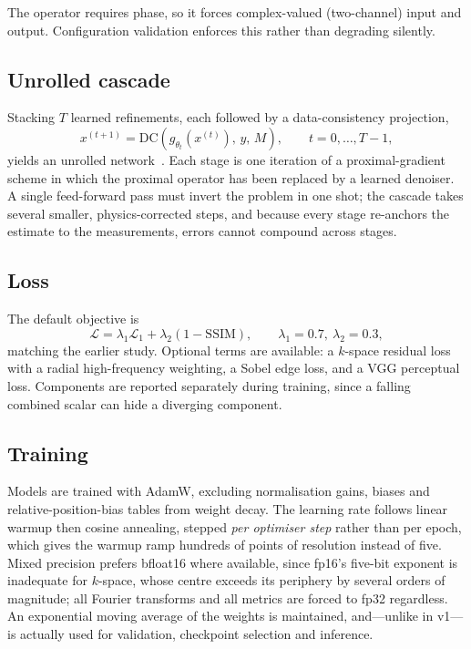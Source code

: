 \documentclass[11pt]{article}
\begin{document}
The operator requires phase, so it forces complex-valued (two-channel) input and
output. Configuration validation enforces this rather than degrading silently.

\subsection{Unrolled cascade}

Stacking $T$ learned refinements, each followed by a data-consistency
projection,
\begin{equation}
x^{(t+1)} = \mathrm{DC}\!\left(g_{\theta_t}(x^{(t)}),\, y,\, M\right),
\qquad t = 0,\dots,T-1,
\end{equation}
yields an unrolled network~\cite{schlemper2018, hammernik2018}. Each stage is
one iteration of a proximal-gradient scheme in which the proximal operator has
been replaced by a learned denoiser. A single feed-forward pass must invert the
problem in one shot; the cascade takes several smaller, physics-corrected steps,
and because every stage re-anchors the estimate to the measurements, errors
cannot compound across stages.

\subsection{Loss}

The default objective is
\begin{equation}
\mathcal{L} = \lambda_1 \mathcal{L}_{1} + \lambda_2 (1 - \mathrm{SSIM}),
\qquad \lambda_1 = 0.7,\ \lambda_2 = 0.3,
\end{equation}
matching the earlier study. Optional terms are available: a $k$-space residual
loss with a radial high-frequency weighting, a Sobel edge loss, and a VGG
perceptual loss. Components are reported separately during training, since a
falling combined scalar can hide a diverging component.

\subsection{Training}

Models are trained with AdamW, excluding normalisation gains, biases and
relative-position-bias tables from weight decay. The learning rate follows
linear warmup then cosine annealing, stepped \emph{per optimiser step} rather
than per epoch, which gives the warmup ramp hundreds of points of resolution
instead of five. Mixed precision prefers bfloat16 where available, since fp16's
five-bit exponent is inadequate for $k$-space, whose centre exceeds its
periphery by several orders of magnitude; all Fourier transforms and all metrics
are forced to fp32 regardless. An exponential moving average of the weights is
maintained, and---unlike in v1---is actually used for validation,
checkpoint selection and inference.
\end{document}
